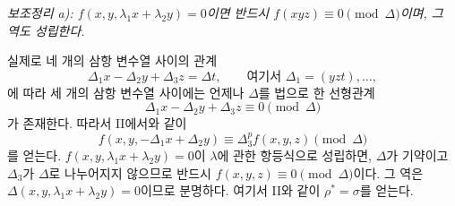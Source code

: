 
\emph{보조정리 a): $f(x,y,\lambda_1x+\lambda_2y)=0$이면 반드시 $f(xyz)\equiv0\pmod{\Delta}$이며, 그 역도 성립한다.}

실제로 네 개의 삼항 변수열 사이의 관계
\[
  \Delta_1x-\Delta_2y+\Delta_3z=\Delta t,
  \qquad \text{여기서 }\Delta_1=(yzt),\ldots,
\]
에 따라 세 개의 삼항 변수열 사이에는 언제나 $\Delta$를 법으로 한 선형관계
\[
  \Delta_1x-\Delta_2y+\Delta_3z\equiv0\pmod{\Delta}
\]
가 존재한다. 따라서 II에서와 같이
\[
  f(x,y,-\Delta_1x+\Delta_2y)\equiv\Delta_3^p f(x,y,z)\pmod{\Delta}
\]
를 얻는다. $f(x,y,\lambda_1x+\lambda_2y)=0$이 $\lambda$에 관한 항등식으로 성립하면, $\Delta$가 기약이고 $\Delta_3$가 $\Delta$로 나누어지지 않으므로 반드시 $f(x,y,z)\equiv0\pmod{\Delta}$이다. 그 역은 $\Delta(x,y,\lambda_1x+\lambda_2y)=0$이므로 분명하다. 여기서 II와 같이 $\rho^*=\sigma$를 얻는다.
